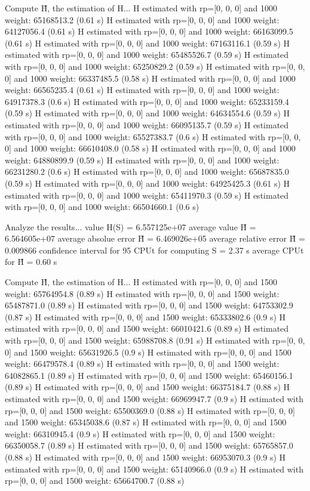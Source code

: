 Compute H̃, the estimation of H...
  H estimated with rp=[0, 0, 0] and 1000 weight:  65168513.2  (0.61 s)
  H estimated with rp=[0, 0, 0] and 1000 weight:  64127056.4  (0.61 s)
  H estimated with rp=[0, 0, 0] and 1000 weight:  66163099.5  (0.61 s)
  H estimated with rp=[0, 0, 0] and 1000 weight:  67163116.1  (0.59 s)
  H estimated with rp=[0, 0, 0] and 1000 weight:  65485526.7  (0.59 s)
  H estimated with rp=[0, 0, 0] and 1000 weight:  65250829.2  (0.59 s)
  H estimated with rp=[0, 0, 0] and 1000 weight:  66337485.5  (0.58 s)
  H estimated with rp=[0, 0, 0] and 1000 weight:  66565235.4  (0.61 s)
  H estimated with rp=[0, 0, 0] and 1000 weight:  64917378.3  (0.6 s)
  H estimated with rp=[0, 0, 0] and 1000 weight:  65233159.4  (0.59 s)
  H estimated with rp=[0, 0, 0] and 1000 weight:  64634554.6  (0.59 s)
  H estimated with rp=[0, 0, 0] and 1000 weight:  66095135.7  (0.59 s)
  H estimated with rp=[0, 0, 0] and 1000 weight:  65527383.7  (0.6 s)
  H estimated with rp=[0, 0, 0] and 1000 weight:  66610408.0  (0.58 s)
  H estimated with rp=[0, 0, 0] and 1000 weight:  64880899.9  (0.59 s)
  H estimated with rp=[0, 0, 0] and 1000 weight:  66231280.2  (0.6 s)
  H estimated with rp=[0, 0, 0] and 1000 weight:  65687835.0  (0.59 s)
  H estimated with rp=[0, 0, 0] and 1000 weight:  64925425.3  (0.61 s)
  H estimated with rp=[0, 0, 0] and 1000 weight:  65411970.3  (0.59 s)
  H estimated with rp=[0, 0, 0] and 1000 weight:  66504660.1  (0.6 s)

Analyze the results...
  value H(S)                  = 6.557125e+07 
  average value H̃             = 6.564605e+07 
  average absolue error H̃     = 6.469026e+05 
  average relative error H̃    = 0.009866 
  confidence interval for 95%
  CPUt for computing S         = 2.37 s
  average CPUt for H̃           = 0.60 s

Compute H̃, the estimation of H...
  H estimated with rp=[0, 0, 0] and 1500 weight:  65764954.8  (0.89 s)
  H estimated with rp=[0, 0, 0] and 1500 weight:  65487871.0  (0.89 s)
  H estimated with rp=[0, 0, 0] and 1500 weight:  64753302.9  (0.87 s)
  H estimated with rp=[0, 0, 0] and 1500 weight:  65333802.6  (0.9 s)
  H estimated with rp=[0, 0, 0] and 1500 weight:  66010421.6  (0.89 s)
  H estimated with rp=[0, 0, 0] and 1500 weight:  65988708.8  (0.91 s)
  H estimated with rp=[0, 0, 0] and 1500 weight:  65631926.5  (0.9 s)
  H estimated with rp=[0, 0, 0] and 1500 weight:  66479578.4  (0.89 s)
  H estimated with rp=[0, 0, 0] and 1500 weight:  64082865.1  (0.89 s)
  H estimated with rp=[0, 0, 0] and 1500 weight:  65460156.1  (0.89 s)
  H estimated with rp=[0, 0, 0] and 1500 weight:  66375184.7  (0.88 s)
  H estimated with rp=[0, 0, 0] and 1500 weight:  66969947.7  (0.9 s)
  H estimated with rp=[0, 0, 0] and 1500 weight:  65500369.0  (0.88 s)
  H estimated with rp=[0, 0, 0] and 1500 weight:  65345038.6  (0.87 s)
  H estimated with rp=[0, 0, 0] and 1500 weight:  66310945.4  (0.9 s)
  H estimated with rp=[0, 0, 0] and 1500 weight:  66350058.7  (0.89 s)
  H estimated with rp=[0, 0, 0] and 1500 weight:  65765857.0  (0.88 s)
  H estimated with rp=[0, 0, 0] and 1500 weight:  66953070.3  (0.9 s)
  H estimated with rp=[0, 0, 0] and 1500 weight:  65140966.0  (0.9 s)
  H estimated with rp=[0, 0, 0] and 1500 weight:  65664700.7  (0.88 s)

